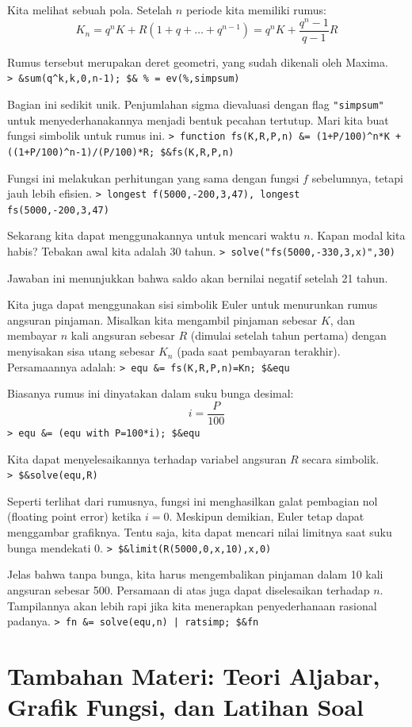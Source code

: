 \documentclass[11pt, a4paper]{article}
\newcommand{\emtcmd}[1]{\noindent\texttt{\textcolor{emtcommand}{>}\ #1}\par\smallskip}
\begin{document}
Kita melihat sebuah pola. Setelah $n$ periode kita memiliki rumus:
$$K_n = q^n K + R (1+q+\ldots+q^{n-1}) = q^n K + \frac{q^n-1}{q-1} R$$

Rumus tersebut merupakan deret geometri, yang sudah dikenali oleh Maxima.
\emtcmd{\&sum(q\^{}k,k,0,n-1); \$\& \% = ev(\%,simpsum)}

Bagian ini sedikit unik. Penjumlahan sigma dievaluasi dengan flag \texttt{"simpsum"} untuk menyederhanakannya menjadi bentuk pecahan tertutup. Mari kita buat fungsi simbolik untuk rumus ini.
\emtcmd{function fs(K,R,P,n) \&= (1+P/100)\^{}n*K + ((1+P/100)\^{}n-1)/(P/100)*R; \$\&fs(K,R,P,n)}

Fungsi ini melakukan perhitungan yang sama dengan fungsi $f$ sebelumnya, tetapi jauh lebih efisien.
\emtcmd{longest f(5000,-200,3,47), longest fs(5000,-200,3,47)}

Sekarang kita dapat menggunakannya untuk mencari waktu $n$. Kapan modal kita habis? Tebakan awal kita adalah 30 tahun.
\emtcmd{solve("fs(5000,-330,3,x)",30)}

Jawaban ini menunjukkan bahwa saldo akan bernilai negatif setelah 21 tahun.

Kita juga dapat menggunakan sisi simbolik Euler untuk menurunkan rumus angsuran pinjaman. Misalkan kita mengambil pinjaman sebesar $K$, dan membayar $n$ kali angsuran sebesar $R$ (dimulai setelah tahun pertama) dengan menyisakan sisa utang sebesar $K_n$ (pada saat pembayaran terakhir). Persamaannya adalah:
\emtcmd{equ \&= fs(K,R,P,n)=Kn; \$\&equ}

Biasanya rumus ini dinyatakan dalam suku bunga desimal:
$$i = \frac{P}{100}$$
\emtcmd{equ \&= (equ with P=100*i); \$\&equ}

Kita dapat menyelesaikannya terhadap variabel angsuran $R$ secara simbolik.
\emtcmd{\$\&solve(equ,R)}

Seperti terlihat dari rumusnya, fungsi ini menghasilkan galat pembagian nol (floating point error) ketika $i=0$. Meskipun demikian, Euler tetap dapat menggambar grafiknya. Tentu saja, kita dapat mencari nilai limitnya saat suku bunga mendekati 0.
\emtcmd{\$\&limit(R(5000,0,x,10),x,0)}

Jelas bahwa tanpa bunga, kita harus mengembalikan pinjaman dalam 10 kali angsuran sebesar 500. Persamaan di atas juga dapat diselesaikan terhadap $n$. Tampilannya akan lebih rapi jika kita menerapkan penyederhanaan rasional padanya.
\emtcmd{fn \&= solve(equ,n) | ratsimp; \$\&fn}

\hrulefill
\section*{Tambahan Materi: Teori Aljabar, Grafik Fungsi, dan Latihan Soal}
\hrulefill
\end{document}
